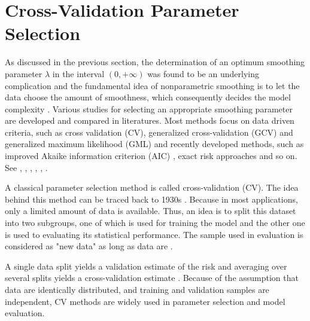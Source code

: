 \section{Cross-Validation Parameter Selection}

As discussed in the previous section, the determination of an optimum smoothing parameter $\lambda$ in the interval $(0,+\infty)$ was found to be an underlying complication and the fundamental idea of nonparametric smoothing is to let the data choose the amount of smoothness, which consequently decides the model complexity \cite{gu1998model}. Various studies for selecting an appropriate smoothing parameter are developed and compared in literatures. Most methods focus on data driven criteria, such as cross validation (CV), generalized cross-validation (GCV) \cite{craven1978smoothing} and generalized maximum likelihood (GML) \cite{wahba1985comparison} and recently developed methods, such as improved Akaike information criterion (AIC) \cite{hurvich1998smoothing}, exact risk approaches \cite{wand1997exact} and so on. See \eg \cite{craven1978smoothing}, \cite{hardle1988far}, \cite{hardle1990applied}, \cite{wahba1990spline},  \cite{green1993nonparametric}, \cite{cantoni2001resistant} \cite{aydin2013smoothing}.  



A classical parameter selection method is called cross-validation (CV). The idea behind this method can be traced back to 1930s \cite{larson1931shrinkage}. Because in most applications, only a limited amount of data is available. Thus, an idea is to split this dataset into two subgroups, one of which is used for training the model and the other one is used to evaluating its statistical performance. The sample used in evaluation is considered as "new data" as long as data are \iid. 

A single data split yields a validation estimate of the risk and averaging over several splits yields a cross-validation estimate \cite{arlot2010survey}. Because of the assumption that data are identically distributed, and training and validation samples are independent, CV methods are widely used in parameter selection and model evaluation. 


